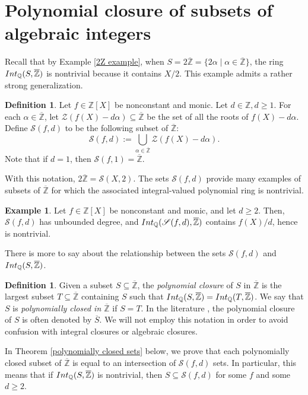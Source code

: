 \documentclass{article}
\theoremstyle{definition}\newtheorem{Def}[equation]{Definition}
\newtheorem{Ex}[equation]{Example}
\theoremstyle{definition}\newtheorem{Ques}[equation]{Question}
\theoremstyle{definition}\newtheorem{Conj}[equation]{Conjecture}
\theoremstyle{definition}\newtheorem{Not}[equation]{Notation}
\newcommand{\Q}{\mathbb{Q}}
\newcommand{\oZ}{\overline{\Z}}
\newcommand{\Z}{\mathbb{Z}}
\newcommand{\Int}{\textnormal{Int}}
\newcommand{\IntQ}{\Int_{\Q}}
\newcommand{\msS}{\mathscr{S}}
\newcommand{\mcZ}{\mathcal{Z}}
\numberwithin{equation}{section}
\begin{document}
\vskip1cm

\section{Polynomial closure of subsets of algebraic integers}\label{Poly closure section}

Recall that by Example \ref{2Z example}, when $S=2\oZ = \{2\alpha \mid \alpha \in \oZ\}$, the ring $\IntQ(S,\oZ)$ is nontrivial because it contains $X/2$. This example admits a rather strong generalization.

\begin{Def}\label{S(f,d) sets}
Let $f \in \Z[X]$ be nonconstant and monic. Let $d \in \Z, d \geq 1$. For each $\alpha \in \oZ$, let $\mathcal{Z}(f(X)-d\alpha) \subseteq \oZ$ be the set of all the roots of $f(X)-d\alpha$. Define $\msS(f,d)$ to be the following subset of $\oZ$:
\begin{equation*}
\msS(f,d) := \bigcup_{\alpha \in \oZ} \mcZ(f(X)-d\alpha).
\end{equation*}
Note that if $d=1$, then $\msS(f,1) = \oZ$.
\end{Def}

With this notation, $2\oZ = \msS(X,2)$. The sets $\msS(f,d)$ provide many examples of subsets of $\oZ$ for which the associated integral-valued polynomial ring is nontrivial.

\begin{Ex}\label{unbounded nontrivial examples}
Let $f \in \Z[X]$ be nonconstant and monic, and let $d \geq 2$. Then, $\msS(f,d)$ has unbounded degree, and $\IntQ(\msS(f,d), \oZ)$ contains $f(X)/d$, hence is nontrivial. 
\end{Ex}

There is more to say about the relationship between the sets $\msS(f,d)$ and $\IntQ(S,\oZ)$.

\begin{Def}\label{Polynomial closure}
Given a subset $S \subseteq \oZ$, the \textit{polynomial closure} of $S$ in $\oZ$ is the largest subset $T \subseteq \oZ$ containing $S$ such that $\IntQ(S,\oZ) = \IntQ(T,\oZ)$. We say that $S$ is \emph{polynomially closed in $\oZ$} if $S=T$. In the literature \cite{ChabPolCloVal, PS4}, the polynomial closure of $S$ is often denoted by $\overline{S}$. We will not employ this notation in order to avoid confusion with integral closures or algebraic closures.
\end{Def}

In Theorem \ref{polynomially closed sets} below, we prove that each polynomially closed subset of $\oZ$ is equal to an intersection of $\msS(f,d)$ sets. In particular, this means that if $\IntQ(S,\oZ)$ is nontrivial, then $S \subseteq \msS(f,d)$ for some $f$ and some $d \geq 2$.
\end{document}
